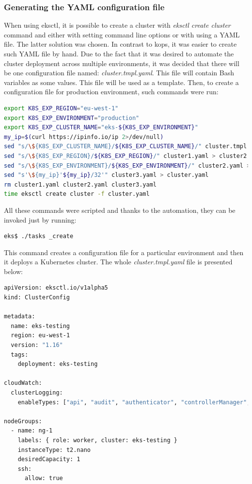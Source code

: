 \subsubsection{Generating the YAML configuration file}
When using eksctl, it is possible to create a cluster with \textit{eksctl create cluster} command and either with setting command line options or with using a YAML file. The latter solution was chosen. In contrast to kops, it was easier to create such YAML file by hand. Due to the fact that it was desired to automate the cluster deployment across multiple environments, it was decided that there will be one configuration file named: \textit{cluster.tmpl.yaml}. This file will contain Bash variables as some values. This file will be used as a template. Then, to create a configuration file for production environment, such commands were run:
\begin{lstlisting}[basicstyle=\tiny,caption={TODO},captionpos=b,language=Bash,xleftmargin=1cm]
export K8S_EXP_REGION="eu-west-1"
export K8S_EXP_ENVIRONMENT="production"
export K8S_EXP_CLUSTER_NAME="eks-${K8S_EXP_ENVIRONMENT}"
my_ip=$(curl https://ipinfo.io/ip 2>/dev/null)
sed "s/\${K8S_EXP_CLUSTER_NAME}/${K8S_EXP_CLUSTER_NAME}/" cluster.tmpl.yaml > cluster1.yaml
sed "s/\${K8S_EXP_REGION}/${K8S_EXP_REGION}/" cluster1.yaml > cluster2.yaml
sed "s/\${K8S_EXP_ENVIRONMENT}/${K8S_EXP_ENVIRONMENT}/" cluster2.yaml > cluster3.yaml
sed "s'\${my_ip}'${my_ip}/32'" cluster3.yaml > cluster.yaml
rm cluster1.yaml cluster2.yaml cluster3.yaml
time eksctl create cluster -f cluster.yaml
\end{lstlisting}

All these commands were scripted and thanks to the automation, they can be invoked just by running:
\begin{lstlisting}[basicstyle=\tiny,caption={TODO},captionpos=b,language=Bash,xleftmargin=1cm]
eks$ ./tasks _create
\end{lstlisting}
This command creates a configuration file for a particular environment and then it deploys a Kubernetes cluster. The whole \textit{cluster.tmpl.yaml} file is presented below:
\begin{lstlisting}[basicstyle=\tiny,caption={TODO},captionpos=b,language=Bash,xleftmargin=1cm]
apiVersion: eksctl.io/v1alpha5
kind: ClusterConfig

metadata:
  name: eks-testing
  region: eu-west-1
  version: "1.16"
  tags:
    deployment: eks-testing

cloudWatch:
  clusterLogging:
    enableTypes: ["api", "audit", "authenticator", "controllerManager", "scheduler"]

nodeGroups:
  - name: ng-1
    labels: { role: worker, cluster: eks-testing }
    instanceType: t2.nano
    desiredCapacity: 1
    ssh:
      allow: true

\end{lstlisting}

